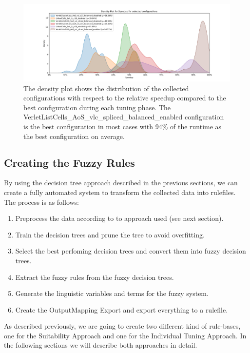 \begin{figure}[H]
    \centering
    \includegraphics[width=\columnwidth,trim={1cm 0 2cm 1.5cm},clip]{figures/DataAnalytics/speedup_density_configurations.png}
    \caption[Speedup density plot of configurations]{The density plot shows the distribution of the collected configurations with respect to the relative speedup compared to the best configuration during each tuning phase. The VerletListCells\_AoS\_vlc\_spliced\_balanced\_enabled configuration is the best configuration in most cases with 94\% of the runtime as the best configuration on average.}
    \label{fig:inputAnalysisDensityConfigurations}
\end{figure}

\subsection{Creating the Fuzzy Rules}

By using the decision tree approach described in the previous sections, we can create a fully automated system to transform the collected data into rulefiles. The process is as follows:

\begin{enumerate}
    \item Preprocess the data according to to approach used (see next section).
    \item Train the decision trees and prune the tree to avoid overfitting.
    \item Select the best perfoming decision trees and convert them into fuzzy decision trees.
    \item Extract the fuzzy rules from the fuzzy decision trees.
    \item Generate the linguistic variables and terms for the fuzzy system.
    \item Create the OutputMapping Export and export everything to a rulefile.
\end{enumerate}

As described previously, we are going to create two different kind of rule-bases, one for the Suitability Approach and one for the Individual Tuning Approach. In the following sections we will describe both approaches in detail.

